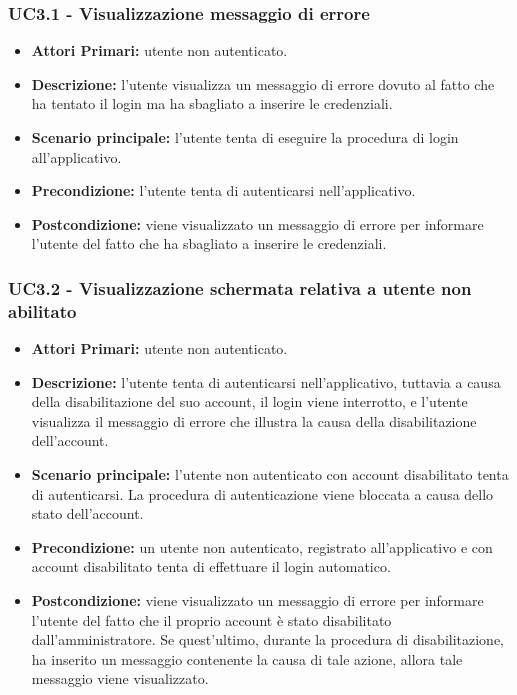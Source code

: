 \subsubsection{ UC3.1 - Visualizzazione messaggio di errore}
\begin{itemize}
	\item\textbf{Attori Primari:} utente non autenticato.
	\item\textbf{Descrizione:} l'utente visualizza un messaggio di errore dovuto al fatto che ha tentato il login ma ha sbagliato a inserire le credenziali.
	\item\textbf{Scenario principale:} l’utente tenta di eseguire la procedura di login all'applicativo.
	\item\textbf{Precondizione:} l'utente tenta di autenticarsi nell'applicativo.
	\item\textbf{Postcondizione:} viene visualizzato un messaggio di errore per informare l'utente del fatto che ha sbagliato a inserire le credenziali.
\end{itemize}
\subsubsection{ UC3.2 - Visualizzazione schermata relativa a utente non abilitato}
\begin{itemize}
           	\item\textbf{Attori Primari:} utente non autenticato.
           	\item\textbf{Descrizione:} l'utente tenta di autenticarsi nell'applicativo, tuttavia a causa della disabilitazione del suo account, il login viene interrotto, e
           	l'utente visualizza il messaggio di errore che illustra la causa della disabilitazione dell'account.
           	\item\textbf{Scenario principale:} l’utente non autenticato con account disabilitato tenta di autenticarsi. 
           	La procedura di autenticazione viene bloccata a causa dello stato dell'account.
           	\item\textbf{Precondizione:} un utente non autenticato, registrato all'applicativo e con account disabilitato tenta di effettuare il login automatico. 
           	\item\textbf{Postcondizione:} viene visualizzato un messaggio di errore per informare l'utente del fatto che il 
           	proprio account è stato disabilitato dall'amministratore. Se quest'ultimo, durante la procedura di disabilitazione, ha inserito un messaggio contenente la causa di tale azione, allora tale messaggio viene visualizzato.
\end{itemize}


